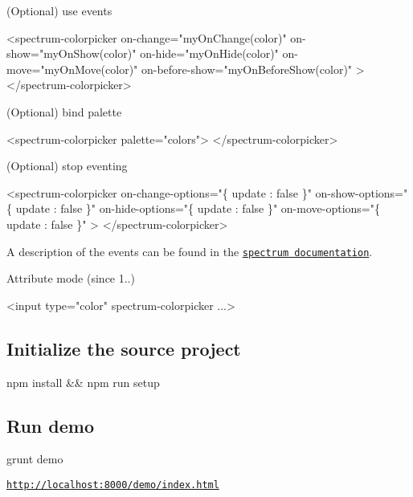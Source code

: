 \begin{DoxyItemize}
\item (Optional) use events 
\begin{DoxyCode}
<spectrum-colorpicker
  on-change="myOnChange(color)"
  on-show="myOnShow(color)"
  on-hide="myOnHide(color)"
  on-move="myOnMove(color)"
  on-before-show="myOnBeforeShow(color)"
  >
</spectrum-colorpicker>
\end{DoxyCode}

\item (Optional) bind palette 
\begin{DoxyCode}
<spectrum-colorpicker
  palette="colors">
</spectrum-colorpicker>
\end{DoxyCode}

\item (Optional) stop eventing 
\begin{DoxyCode}
<spectrum-colorpicker
  on-change-options="\{ update : false \}"
  on-show-options="\{ update : false \}"
  on-hide-options="\{ update : false \}"
  on-move-options="\{ update : false \}"
  >
</spectrum-colorpicker>
\end{DoxyCode}
 A description of the events can be found in the \href{https://bgrins.github.io/spectrum/#events}{\tt spectrum documentation}.
\item Attribute mode (since 1..) 
\begin{DoxyCode}
<input type="color" spectrum-colorpicker ...>
\end{DoxyCode}

\end{DoxyItemize}

\subsection*{Initialize the source project }


\begin{DoxyCode}
npm install && npm run setup
\end{DoxyCode}


\subsection*{Run demo }


\begin{DoxyCode}
grunt demo
\end{DoxyCode}


\href{http://localhost:8000/demo/index.html}{\tt http\+://localhost\+:8000/demo/index.\+html}

